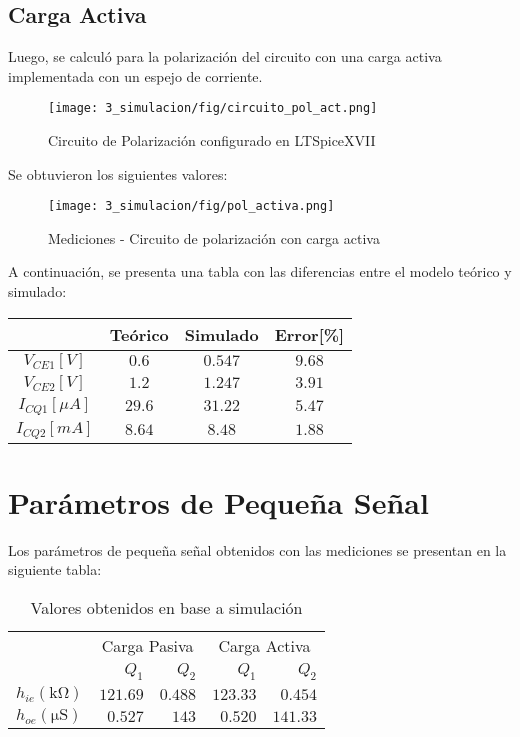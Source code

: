 \subsection{Carga Activa}

Luego, se calculó  para la polarización del circuito con una carga activa implementada con un espejo de corriente.

\begin{figure}[H]
    \centering
    \texttt{[image: 3\_simulacion/fig/circuito\_pol\_act.png]}
    \label{circuito_pol_activa}
    \caption{Circuito de Polarización configurado en LTSpiceXVII}
\end{figure}

Se obtuvieron los siguientes valores:

\begin{figure}[H]
    \centering
    \texttt{[image: 3\_simulacion/fig/pol\_activa.png]}
    \label{mediciones_pol_activa}
    \caption{Mediciones - Circuito de polarización con carga activa}
\end{figure}

A continuación, se presenta una tabla con las diferencias entre el modelo teórico y simulado:

\begin{table}[H]
    \centering
    \begin{tabular}{|c|c|c|c|}
    \hline
                        & Teórico & Simulado & Error[\%] \\ \hline
    $V_{CE1}[V]$        & $0.6$   & $0.547$  & $9.68$    \\ \hline
    $V_{CE2}[V]$        & $1.2$   & $1.247$   & $3.91$   \\ \hline
    $I_{CQ1}[\mu A]$ & $29.6$  & $31.22$  & $5.47$   \\ \hline
    $I_{CQ2}[mA]$ & $8.64$  & $8.48$  & $1.88$   \\ \hline
    \end{tabular}
    \end{table}



\section{Parámetros de Pequeña Señal}
Los parámetros de pequeña señal obtenidos con las mediciones se presentan en la siguiente tabla:

\begin{table}[H]
    \centering
    \begin{tabular}{|l|r|r|r|r|}
        \hline
        \multirow{2}{*}{} & \multicolumn{2}{c|}{Carga Pasiva} & \multicolumn{2}{c|}{Carga Activa} \\ \cline{2-5} 
         & $Q_1$ & $Q_2$ & $Q_1$ & $Q_2$ \\ \hline
        $h_{ie} (\si{\kilo\ohm})$ & $121.69$ & $0.488$ & $123.33$ & $0.454$ \\
        $h_{oe} (\si{\micro\siemens})$ & $0.527$ & $143$ & $0.520$ & $141.33$ \\\hline
    \end{tabular}
    \caption{Valores  obtenidos en base a simulación}
    \label{tab:vals_teo_2}
\end{table}

